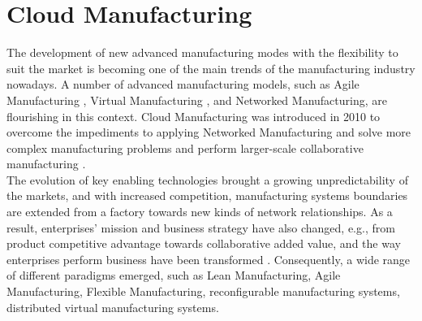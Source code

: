 \section{Cloud Manufacturing}
The development of new advanced manufacturing modes with the flexibility to suit the market is becoming one of the main trends of the manufacturing industry nowadays. A number of advanced manufacturing models, such as Agile Manufacturing \parencite{yy_yusuf_agile_1999}, Virtual Manufacturing \parencite{souza_virtual_2006}, and Networked Manufacturing, are flourishing in this context. Cloud Manufacturing was introduced in 2010 to overcome the impediments to applying Networked Manufacturing and solve more complex manufacturing problems and perform larger-scale collaborative manufacturing \parencite{bo-hu_cloud_2010}.\\
The evolution of key enabling technologies brought a growing unpredictability of the markets, and with increased competition, manufacturing systems boundaries are extended from a factory towards new kinds of network relationships. As a result, enterprises’ mission and business strategy have also changed, e.g., from product competitive advantage towards collaborative added value, and the way enterprises perform business have been transformed \parencite{chituc2009challenges}. Consequently, a wide range of different paradigms emerged, such as Lean Manufacturing, Agile Manufacturing, Flexible Manufacturing, reconfigurable manufacturing systems, distributed virtual manufacturing systems.\\
